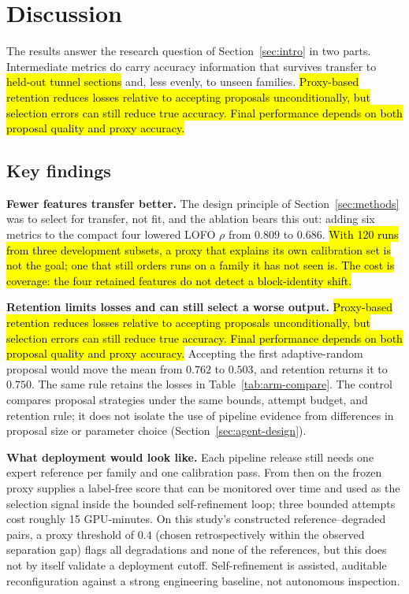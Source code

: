 \documentclass[a4paper,fleqn]{cas-dc}
\begin{document}
{%
\section{Discussion}\label{sec:discussion}

The results answer the research question of Section~\ref{sec:intro} in two parts. Intermediate metrics do carry accuracy information that survives transfer to \hl{held-out tunnel sections} and, less evenly, to unseen families. \hl{Proxy-based retention reduces losses relative to accepting proposals unconditionally, but selection errors can still reduce true accuracy. Final performance depends on both proposal quality and proxy accuracy.}

\subsection{Key findings}

\textbf{Fewer features transfer better.} The design principle of Section~\ref{sec:methods} was to select for transfer, not fit, and the ablation bears this out: adding six metrics to the compact four lowered LOFO $\rho$ from $0.809$ to $0.686$. \hl{With 120 runs from three development subsets, a proxy that explains its own calibration set is not the goal; one that still orders runs on a family it has not seen is. The cost is coverage: the four retained features do not detect a block-identity shift.}

\textbf{Retention limits losses and can still select a worse output.} \hl{Proxy-based retention reduces losses relative to accepting proposals unconditionally, but selection errors can still reduce true accuracy. Final performance depends on both proposal quality and proxy accuracy.} Accepting the first adaptive-random proposal would move the mean from $0.762$ to $0.503$, and retention returns it to $0.750$. The same rule retains the losses in Table~\ref{tab:arm-compare}. The control compares proposal strategies under the same bounds, attempt budget, and retention rule; it does not isolate the use of pipeline evidence from differences in proposal size or parameter choice (Section~\ref{sec:agent-design}).

\textbf{What deployment would look like.} Each pipeline release still needs one expert reference per family and one calibration pass. From then on the frozen proxy supplies a label-free score that can be monitored over time and used as the selection signal inside the bounded self-refinement loop; three bounded attempts cost roughly 15 GPU-minutes. On this study's constructed reference--degraded pairs, a proxy threshold of $0.4$ (chosen retrospectively within the observed separation gap) flags all degradations and none of the references, but this does not by itself validate a deployment cutoff. Self-refinement is assisted, auditable reconfiguration against a strong engineering baseline, not autonomous inspection.

}
\end{document}
